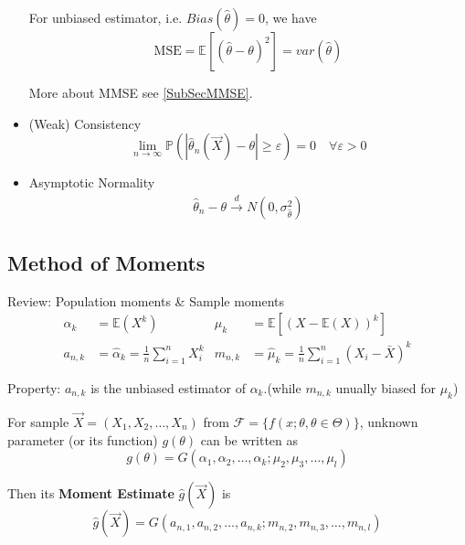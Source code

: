 \begin{itemize}
        For unbiased estimator, i.e. $Bias(\hat{\theta})=0$, we have
        \begin{equation}
            \text{MSE}=\mathbb{E}[(\hat{\theta}-\theta)^2]=var(\hat{\theta})
        \end{equation}

        More about MMSE see \autoref{SubSecMMSE}.
        \item (Weak) Consistency
        \begin{equation}
            \lim_{n\to\infty}\mathbb{P}(|\hat{\theta }_n(\vec{X})-\theta|\geq \varepsilon)=0\quad\forall\varepsilon>0    
        \end{equation}
        \item Asymptotic Normality
        \begin{align}
            \hat{\theta }_n-\theta \xrightarrow[]{d} N(0,\sigma ^2_{\hat{\theta }}) 
        \end{align}
        
        
    \end{itemize}


\subsection{Method of Moments}\label{SubSectionMoM}
    Review: Population moments \& Sample moments
    \begin{align}
        \alpha_k&=\mathbb{E}(X^k)&\mu_k&=\mathbb{E}[(X-\mathbb{E}(X))^k]\\
        a_{n,k}&=\hat{\alpha }_k =\frac{1}{n}\sum_{i=1}^nX_i^k&m_{n,k}&=\hat{\mu }_k=\frac{1}{n}\sum_{i=1}^n(X_i-\bar{X})^k
    \end{align}

    Property: $a_{n,k}$ is the unbiased estimator of $\alpha_k$.(while $m_{n,k}$ unually biased for $\mu_k$)

    For sample $\vec{X}=(X_1,X_2,\ldots,X_n)$ from $\mathscr{F}=\{f(x;\theta,\theta\in\Theta)\}$, unknown parameter (or its function) $g(\theta)$ can be written as
    \begin{equation}
        g(\theta)=G(\alpha_1,\alpha_2,\ldots,\alpha_k;\mu_2,\mu_3,\ldots,\mu_l)    
    \end{equation}

    Then its \textbf{Moment Estimate} $\hat{g}(\vec{X})$ is
\begin{equation}
    \hat{g}(\vec{X})=G(a_{n,1},a_{n,2},\ldots,a_{n,k};m_{n,2},m_{n,3},\ldots,m_{n,l}) 
\end{equation}

